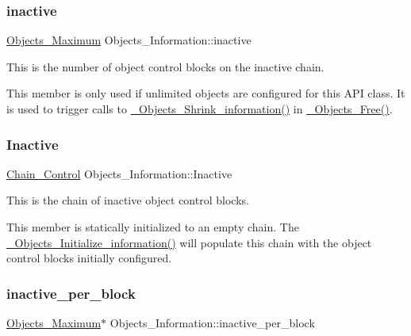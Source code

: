 \subsubsection{\texorpdfstring{inactive}{inactive}}
{\footnotesize\ttfamily \mbox{\hyperlink{group__RTEMSScoreObject_gaa2735357885ec7d7157c32f3f835f9ae}{Objects\+\_\+\+Maximum}} Objects\+\_\+\+Information\+::inactive}



This is the number of object control blocks on the inactive chain. 

This member is only used if unlimited objects are configured for this A\+PI class. It is used to trigger calls to \mbox{\hyperlink{group__RTEMSScoreObject_ga1d3e97a3ed2e9d19c544269a7444be21}{\+\_\+\+Objects\+\_\+\+Shrink\+\_\+information()}} in \mbox{\hyperlink{group__RTEMSScoreObject_ga2215dcf7e3251e6f629b6a3a96fff44e}{\+\_\+\+Objects\+\_\+\+Free()}}. \mbox{\label{structObjects__Information_a585fc550e6e38619c4a3698f4b043dea}} 
\subsubsection{\texorpdfstring{Inactive}{Inactive}}
{\footnotesize\ttfamily \mbox{\hyperlink{unionChain__Control}{Chain\+\_\+\+Control}} Objects\+\_\+\+Information\+::\+Inactive}



This is the chain of inactive object control blocks. 

This member is statically initialized to an empty chain. The \mbox{\hyperlink{group__RTEMSScoreObject_ga968b850454008bc4e68ab83c2f033282}{\+\_\+\+Objects\+\_\+\+Initialize\+\_\+information()}} will populate this chain with the object control blocks initially configured. \mbox{\label{structObjects__Information_a922f0aeeb969a99c7e45812b0283f04a}} 
\subsubsection{\texorpdfstring{inactive\_per\_block}{inactive\_per\_block}}
{\footnotesize\ttfamily \mbox{\hyperlink{group__RTEMSScoreObject_gaa2735357885ec7d7157c32f3f835f9ae}{Objects\+\_\+\+Maximum}}$\ast$ Objects\+\_\+\+Information\+::inactive\+\_\+per\+\_\+block}



